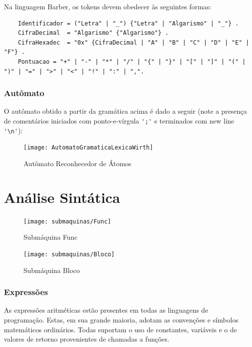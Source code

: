 \documentclass[a4paper,12pt]{report}
\begin{document}
    Na linguagem Barber, os tokens devem obedecer às seguintes formas:

    \begin{lstlisting}
    Identificador = ("Letra" | "_") {"Letra" | "Algarismo" | "_"} .
    CifraDecimal  = "Algarismo" {"Algarismo"} .
    CifraHexadec  = "0x" {CifraDecimal | "A" | "B" | "C" | "D" | "E" | "F"} .
    Pontuacao = "+" | "-" | "*" | "/" | "{" | "}" | "[" | "]" | "(" | ")" | "=" | ">" | "<" | "!" | ":" | ",".
    \end{lstlisting}

    \subsection*{Autômato}
    O autômato obtido a partir da gramática acima é dado a seguir (note a presença de comentários iniciados com ponto-e-vírgula \verb|';'| e terminados com new line \verb|'\n'|):

    \begin{figure}[h]
        \centering
        \caption{Autômato Reconhecedor de Átomos}
        \texttt{[image: AutomatoGramaticaLexicaWirth]}
    \end{figure}


    \chapter*{Análise Sintática}

    \begin{figure}[h]
        \caption{Submáquina Func}
        \texttt{[image: submaquinas/Func]}
    \end{figure}

    \begin{figure}[h]
        \caption{Submáquina Bloco}
        \texttt{[image: submaquinas/Bloco]}
    \end{figure}

    \subsection*{Expressões}
    As expressões aritméticas estão presentes em todas as linguagens de programação. Estas, em sua grande maioria, adotam as convenções e símbolos matemáticos ordinários. Todas suportam o uso de constantes, variáveis e o de valores de retorno provenientes de chamadas a funções.
\end{document}
